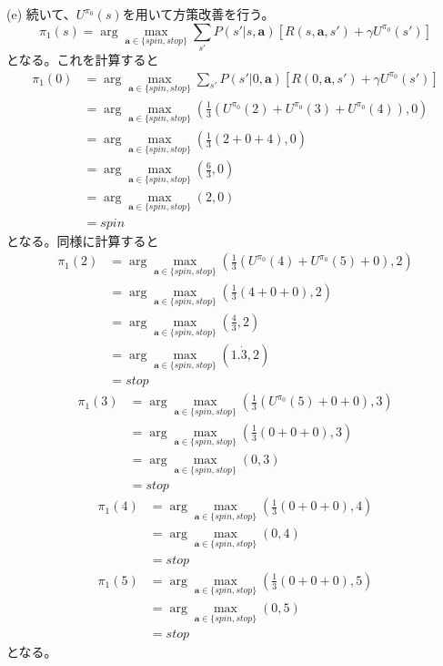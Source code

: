 \documentclass[a4paper,11pt,dvipdfmx]{jsarticle}
\begin{document}
(e)
続いて、\(U^{\pi_0}(s)\)を用いて方策改善を行う。
\[\pi_1(s)=\arg\max_{\textbf{a}\in\{spin,stop\}}\sum_{s'}P(s'|s,\textbf{a})[R(s,\textbf{a},s')+\gamma U^{\pi_0}(s')]\]
となる。これを計算すると
\begin{align*}
    \pi_1(0) &= \arg\max_{\textbf{a}\in\{spin,stop\}}\sum_{s'}P(s'|0,\textbf{a})[R(0,\textbf{a},s')+\gamma U^{\pi_0}(s')] \\
             &= \arg\max_{\textbf{a}\in\{spin,stop\}}(\frac{1}{3}(U^{\pi_0}(2)+U^{\pi_0}(3)+U^{\pi_0}(4)), 0) \\
             &= \arg\max_{\textbf{a}\in\{spin,stop\}}(\frac{1}{3}(2+0+4), 0) \\
                &= \arg\max_{\textbf{a}\in\{spin,stop\}}(\frac{6}{3}, 0) \\
                &= \arg\max_{\textbf{a}\in\{spin,stop\}}(2, 0) \\
                &= spin
\end{align*}
となる。同様に計算すると
\begin{align*}
    \pi_1(2) &= \arg\max_{\textbf{a}\in\{spin,stop\}}(\frac{1}{3}(U^{\pi_0}(4)+U^{\pi_0}(5)+0), 2) \\
             &= \arg\max_{\textbf{a}\in\{spin,stop\}}(\frac{1}{3}(4+0+0), 2) \\
                &= \arg\max_{\textbf{a}\in\{spin,stop\}}(\frac{4}{3}, 2) \\
                &= \arg\max_{\textbf{a}\in\{spin,stop\}}(1.\dot{3}, 2) \\
                &= stop
\end{align*}
\begin{align*}
    \pi_1(3) &= \arg\max_{\textbf{a}\in\{spin,stop\}}(\frac{1}{3}(U^{\pi_0}(5)+0+0), 3) \\
             &= \arg\max_{\textbf{a}\in\{spin,stop\}}(\frac{1}{3}(0+0+0), 3) \\
                &= \arg\max_{\textbf{a}\in\{spin,stop\}}(0, 3) \\
                &= stop
\end{align*}
\begin{align*}
    \pi_1(4) &= \arg\max_{\textbf{a}\in\{spin,stop\}}(\frac{1}{3}(0+0+0), 4) \\
             &= \arg\max_{\textbf{a}\in\{spin,stop\}}(0, 4) \\
                &= stop
\end{align*}
\begin{align*}
    \pi_1(5) &= \arg\max_{\textbf{a}\in\{spin,stop\}}(\frac{1}{3}(0+0+0), 5) \\
             &= \arg\max_{\textbf{a}\in\{spin,stop\}}(0, 5) \\
                &= stop
\end{align*}
となる。
\end{document}
